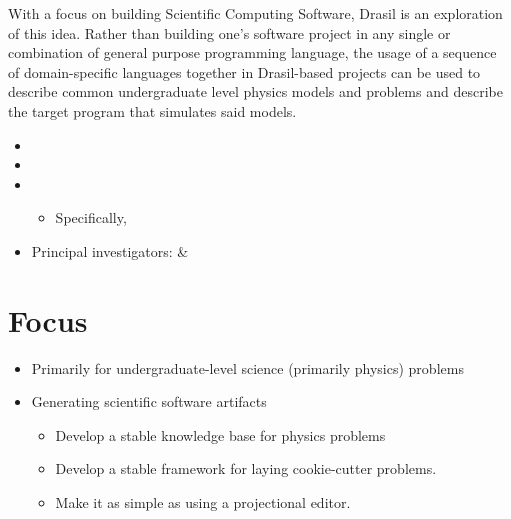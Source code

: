 With a focus on building Scientific Computing Software, Drasil is an exploration
of this idea. Rather than building one's software project in any single or
combination of general purpose programming language, the usage of a sequence of
domain-specific languages together in Drasil-based projects can be used to
describe common undergraduate level physics models and problems and describe the
target program that simulates said models.

\begin{itemize}
    \item {}
    \item {}
    \item {}
          \begin{itemize}
              \item Specifically, 
          \end{itemize}
    \item Principal investigators:  \& 
\end{itemize}

\section{Focus}

\begin{itemize}
    \item Primarily for undergraduate-level science (primarily physics) problems
    \item Generating scientific software artifacts
          \begin{itemize}
              \item Develop a stable knowledge base for physics problems
              \item Develop a stable framework for laying cookie-cutter
                    problems.
              \item Make it as simple as using a projectional editor.
          \end{itemize}
\end{itemize}

